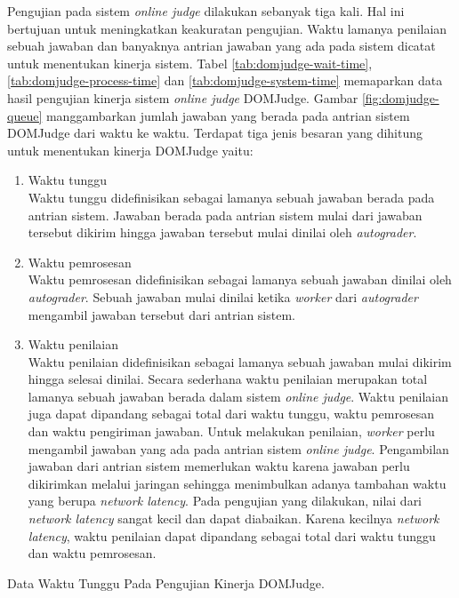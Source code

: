 \par Pengujian pada sistem \textit{online judge} dilakukan sebanyak tiga kali. Hal ini bertujuan untuk meningkatkan keakuratan pengujian. Waktu lamanya penilaian sebuah jawaban dan banyaknya antrian jawaban yang ada pada sistem dicatat untuk menentukan kinerja sistem. Tabel \ref{tab:domjudge-wait-time}, \ref{tab:domjudge-process-time} dan \ref{tab:domjudge-system-time} memaparkan data hasil pengujian kinerja sistem \textit{online judge} DOMJudge. Gambar \ref{fig:domjudge-queue} manggambarkan jumlah jawaban yang berada pada antrian sistem DOMJudge dari waktu ke waktu. Terdapat tiga jenis besaran yang dihitung untuk menentukan kinerja DOMJudge yaitu:
\begin{enumerate}
  \item Waktu tunggu \\ Waktu tunggu didefinisikan sebagai lamanya sebuah jawaban berada pada antrian sistem. Jawaban berada pada antrian sistem mulai dari jawaban tersebut dikirim hingga jawaban tersebut mulai dinilai oleh \textit{autograder}.
  \item Waktu pemrosesan \\ Waktu pemrosesan didefinisikan sebagai lamanya sebuah jawaban dinilai oleh \textit{autograder}. Sebuah jawaban mulai dinilai ketika \textit{worker} dari \textit{autograder} mengambil jawaban tersebut dari antrian sistem.
  \item Waktu penilaian \\ Waktu penilaian didefinisikan sebagai lamanya sebuah jawaban mulai dikirim hingga selesai dinilai. Secara sederhana waktu penilaian merupakan total lamanya sebuah jawaban berada dalam sistem \textit{online judge}. Waktu penilaian juga dapat dipandang sebagai total dari waktu tunggu, waktu pemrosesan dan waktu pengiriman jawaban. Untuk melakukan penilaian, \textit{worker} perlu mengambil jawaban yang ada pada antrian sistem \textit{online judge}. Pengambilan jawaban dari antrian sistem memerlukan waktu karena jawaban perlu dikirimkan melalui jaringan sehingga menimbulkan adanya tambahan waktu yang berupa \textit{network latency}. Pada pengujian yang dilakukan, nilai dari \textit{network latency} sangat kecil dan dapat diabaikan. Karena kecilnya \textit{network latency}, waktu penilaian dapat dipandang sebagai total dari waktu tunggu dan waktu pemrosesan.
\end{enumerate}

\begin{table}[ht]
    \centering
    
    \caption{Data Waktu Tunggu Pada Pengujian Kinerja DOMJudge.}
    \label{tab:domjudge-wait-time}
\end{table}

